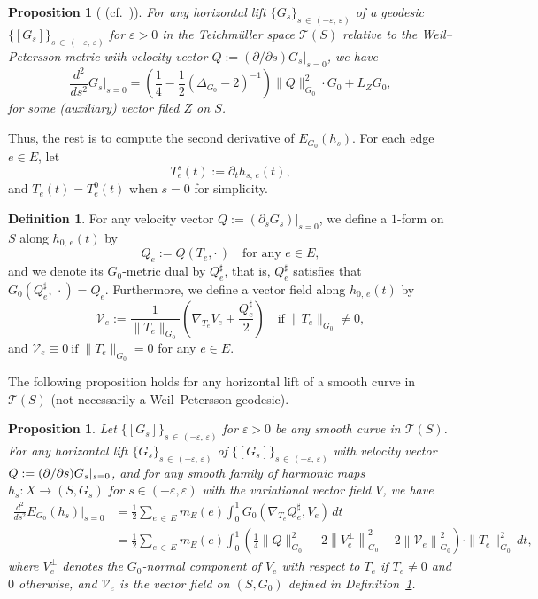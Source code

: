 \documentclass[11pt]{article}
\newtheorem{prop}[theo]{Proposition}
\theoremstyle{definition}
\newtheorem{defi}[theo]{Definition}
\numberwithin{equation}{section}
\newcommand{\e}{\varepsilon}
\newcommand{\p}{\psi}
\newcommand{\Tc}{\mathcal{T}}
\newcommand*\Vc{\mathcal{V}}
\renewcommand*\p{\partial}
\begin{document}
\begin{prop}[{\cite[Theorem~3.8]{Yamada2} (cf.~\cite[Theorem~2.3.2]{Yamada})}]\label{key1}
For any horizontal lift $\{G_{s}\}_{s\,\in\,(-\e,\,\e)}$ of a geodesic $\{[G_{s}]\}_{s\,\in\,(-\e,\,\e)}$ for $\e>0$ in the Teichm\"uller space $\Tc(S)$ relative to the Weil--Petersson metric with velocity vector $Q:=(\p/\p s)G_s|_{s=0}$, we have
\[
\frac{d^2}{d s^2}G_{s}\bigg|_{s=0}=\left(\frac{1}{4}-\frac{1}{2}\left(\Delta_{G_0}-2\right)^{-1}\right)\|Q\|_{G_0}^2\cdot G_0 +L_{Z}G_0,
\]
for some (auxiliary) vector filed $Z$ on $S$.
\end{prop}


Thus, the rest is to compute the second derivative of ${E}_{G_0}(h_{s})$. For each edge $e\in E$, let
\[
T_e^s(t):=\p_th_{s,\,e}(t),
\]
and $T_e(t)=T_e^0(t)$ when $s=0$ for simplicity.


\begin{defi}\label{Def:V}
For any velocity vector $Q:=(\p_s G_s)|_{s=0}$, we define a $1$-form on $S$ along $h_{0, \,e}(t)$ by
\[
Q_e:=Q\left(T_e, \cdot\,\right) \quad \text{for any }e \in E,
\]
and we denote its $G_0$-metric dual by $Q_e^{\sharp}$, that is, $Q_e^{\sharp}$ satisfies that $G_0(Q_e^{\sharp},\,\cdot)=Q_e$. Furthermore, we define a vector field along $h_{0,\,e}(t)$ by
\begin{equation}\label{VW}
\Vc_e:=
\frac{1}{\|T_e\|_{G_0}}\left(\nabla_{T_e}V_e+\frac{Q_e^{\sharp}}{2}\right)\quad \text{if}\;\|T_e\|_{G_0}\neq 0,
\end{equation}
and $\Vc_e\equiv 0\ \text{if}\; \|T_e\|_{G_0}=0$ for any $e \in E$.
\end{defi}



The following proposition holds for any horizontal lift of a smooth curve in $\Tc(S)$ (not necessarily a Weil--Petersson geodesic).

\begin{prop}\label{key2}
Let $\{[G_s]\}_{s\,\in\,(-\e,\,\e)}$ for $\e>0$ be any smooth curve in $\Tc(S)$. For any horizontal lift $\{G_s\}_{s\,\in\,(-\e,\,\e)}$ of $\{[G_s]\}_{s\,\in\,(-\e,\,\e)}$ with velocity vector $Q:=(\p/\p s)\linebreak G_s|_{s=0}$, and for any smooth family of harmonic maps $h_{s}:X \to (S, G_s)$ for $s \in (-\e, \e)$ with the variational vector field $V$, we have
\begin{align*}
\frac{d^2}{d s^2}E_{G_0}(h_{s})\bigg|_{s=0}&=\frac{1}{2}\sum_{e\,\in\,E}m_E(e)\int_0^1G_0\left(\nabla_{T_e}Q_e^{\sharp}, V_e\right)\, dt\\
&=\frac{1}{2}\sum_{e\,\in\,E}m_E(e)\int_0^1\left(
\frac{1}{4}\|Q\|_{G_0}^2-2\left\|V_e^{\perp}\right\|_{G_0}^2-2\left\|\Vc_e\right\|_{G_0}^2
\right)\cdot \|T_e\|_{G_0}^2\,dt,
\end{align*}
where $V_e^{\perp}$ denotes the $G_0$-normal component of $V_e$ with respect to $T_e$ if $T_e \neq 0$ and $0$ otherwise, and $\Vc_e$ is the vector field on $(S, G_0)$ defined in Definition~\ref{Def:V}.
\end{prop}
\end{document}
